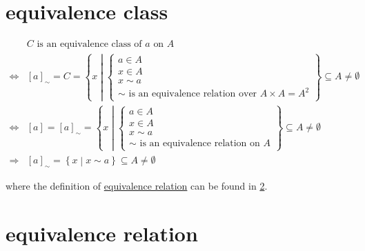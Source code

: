 \documentclass[
]{book}
\theoremstyle{definition}
\theoremstyle{definition}
\theoremstyle{definition}
\theoremstyle{definition}
\theoremstyle{remark}
\begin{document}
\hypertarget{equivalence-class}{%
\chapter{equivalence class}\label{equivalence-class}}

\begin{align*}
 & C\text{ is an equivalence class of }a\text{ on }A\\
\Leftrightarrow & \left[a\right]_{\sim}=C=\left\{ x\middle|\begin{cases}
a\in A\\
x\in A\\
x\sim a\\
\sim\text{ is an equivalence relation over }A\times A=A^{2}
\end{cases}\right\} \subseteq A\ne\emptyset\\
\Leftrightarrow & \left[a\right]=\left[a\right]_{\sim}=\left\{ x\middle|\begin{cases}
a\in A\\
x\in A\\
x\sim a\\
\sim\text{ is an equivalence relation on }A
\end{cases}\right\} \subseteq A\ne\emptyset\\
\Rightarrow & \left[a\right]_{\sim}=\left\{ x\middle|x\sim a\right\} \subseteq A\ne\emptyset
\end{align*}

where the definition of \protect\hyperlink{equivalence-relation}{equivalence relation} can be found in \ref{equivalence-relation}.

\hypertarget{equivalence-relation}{%
\chapter{equivalence relation}\label{equivalence-relation}}
\end{document}
